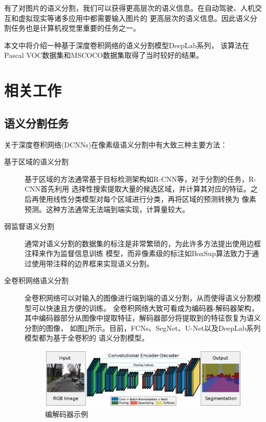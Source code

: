\documentclass[10pt, a4paper]{article}
\begin{document}
有了对图片的语义分割，我们可以获得更高层次的语义信息。在自动驾驶、人机交互和虚拟现实等诸多应用中都需要输入图片的
更高层次的语义信息。因此语义分割任务也是计算机视觉里重要的任务之一。

本文中将介绍一种基于深度卷积网络的语义分割模型DeepLab\cite{Deeplab1,Deeplab2,Deeplab3}系列，
该算法在Pascal VOC数据集\cite{VOC}和MSCOCO数据集\cite{COCO}取得了当时较好的结果。

\section{相关工作}
\subsection{语义分割任务}
关于深度卷积网络(DCNNs)在像素级语义分割中有大致三种主要方法：

\begin{description}
    \item[基于区域的语义分割] 基于区域的方法通常基于目标检测架构如R-CNN\cite{RCNN}等，对于分割的任务，R-CNN首先利用
    选择性搜索提取大量的候选区域，并计算其对应的特征。之后再使用线性分类模型对每个区域进行分类，再将区域的预测转换为
    像素预测。这种方法通常无法端到端实现，计算量较大。
    \item[弱监督语义分割] 通常对语义分割的数据集的标注是非常繁琐的，为此许多方法提出使用边框注释来作为监督信息训练
    模型，而非像素级的标注如BoxSup\cite{BoxSup}算法致力于通过使用带注释的边界框来实现语义分割。
    \item[全卷积网络语义分割] 全卷积网络可以对输入的图像进行端到端的语义分割，从而使得语义分割模型可以快速且方便的训练。
    全卷积网络大致可看成为编码器-解码器架构，其中编码器部分从图像中提取特征，解码器部分将提取到的特征恢复为语义分割的图像，
    如图\ref{p1}所示。目前，FCNs\cite{FCN}、SegNet\cite{SegNet}、U-Net\cite{UNet}以及DeepLab系列模型都为基于全卷积的
    语义分割模型。

    \begin{figure}
        \label{p1}
        \centering
        \includegraphics[width=\textwidth]{p1.eps}
        \caption{编解码器示例\cite{SegNet}}
    \end{figure}
\end{description}
\end{document}

